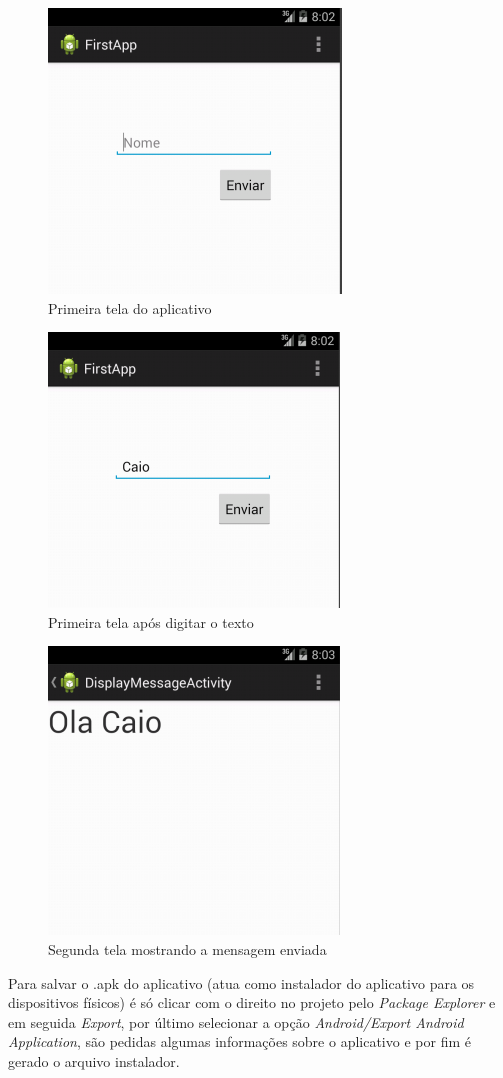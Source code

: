 \documentclass[a4paper,12pt,brazil,oneside]{book}
\begin{document}
\begin{singlespace}
\begin{figure}[H]
  \centering
  \includegraphics[width=.4\textwidth]{figuras/firstapp/firstapp9.png}
  \caption{Primeira tela do aplicativo}
  \label{fig:firstapp9}
\end{figure}

\begin{figure}[H]
  \centering
  \includegraphics[width=.4\textwidth]{figuras/firstapp/firstapp10.png}
  \caption{Primeira tela após digitar o texto}
  \label{fig:firstapp10}
\end{figure}

\begin{figure}[H]
  \centering
  \includegraphics[width=.4\textwidth]{figuras/firstapp/firstapp11.png}
  \caption{Segunda tela mostrando a mensagem enviada}
  \label{fig:firstapp11}
\end{figure}

Para salvar o .apk do aplicativo (atua como instalador do aplicativo para os dispositivos físicos) é só clicar com o direito no projeto pelo \emph{Package Explorer} e em seguida \emph{Export}, por último selecionar a opção \emph{Android/Export Android Application}, são pedidas algumas informações sobre o aplicativo e por fim é gerado o arquivo instalador.


\end{singlespace}
\end{document}
